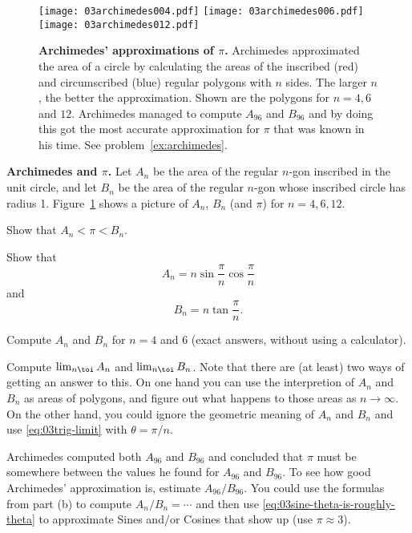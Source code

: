 
\begin{figure}[b]
  \texttt{[image: 03archimedes004.pdf]}
  \texttt{[image: 03archimedes006.pdf]}
  \texttt{[image: 03archimedes012.pdf]}
  \caption{\textbf{Archimedes' approximations of $\pi$. } Archimedes
  approximated the area of a circle by calculating the areas of the
  inscribed (red) and circumscribed (blue) regular polygons with $n$ sides.  The
  larger $n$, the better the approximation.  Shown are the
  polygons for $n=4, 6$ and $12$.  Archimedes managed to compute
  $A_{96}$ and $B_{96}$ and by doing this got the most accurate
  approximation for $\pi$ that was known in his time.  See
  problem~\ref{ex:archimedes}.
  }
  \label{fig:03Archimedes}
\end{figure}

\textbf{Archimedes and $\pi$. }
Let $A_n$ be the area of the regular $n$-gon inscribed in the unit
circle, and let $B_n$ be the area of the regular $n$-gon whose
inscribed circle has radius 1.  Figure~\ref{fig:03Archimedes} shows a
picture of $A_{n}$, $B_n$ (and $\pi$) for $n=4, 6, 12$.

\subprob Show that $A_n < \pi < B_n$.

\subprob Show that
\[
A_n = n \sin\frac{\pi}{n} \cos\frac{\pi}{n}
\]
and
\[
B_n = n \tan\frac\pi n.
\]

\subprob Compute $A_n$ and $B_n$ for $n=4$ and $6$ (exact answers,
without using a calculator).

\subprob Compute $\lim_{n\toi}A_n$ and $\lim_{n\toi}B_n$.
Note that there are (at least) two ways of getting an answer to this.
On one hand you can use the interpretion of $A_n$ and $B_n$ as areas
of polygons, and figure out what happens to those areas as
$n\to\infty$.  On the other hand, you could ignore the geometric
meaning of $A_n$ and $B_n$ and use \ref{eq:03trig-limit} with
$\theta = \pi/n$.

\subprob Archimedes computed both $A_{96}$ and $B_{96}$ and concluded
that $\pi$ must be somewhere between the values he found for $A_{96}$
and $B_{96}$.  To see how good Archimedes' approximation is, estimate
$A_{96}/B_{96}$.  You could use the formulas from part (b) to compute
$A_n/B_n= \cdots$ and then use
\eqref{eq:03sine-theta-is-roughly-theta} to approximate Sines and/or
Cosines that show up (use $\pi\approx 3$).
